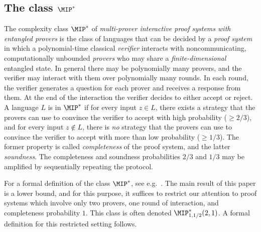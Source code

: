 \documentclass[11pt]{article}
\theoremstyle{definition}
\begin{document}
\subsection{The class $\MIP^*$}

The complexity class $\MIP^*$ of \emph{multi-prover interactive proof
  systems with entangled provers} is the class of languages that can be
decided by a \emph{proof system} in which a polynomial-time classical
\emph{verifier} interacts with noncommunicating, computationally unbounded
 \emph{provers} who may share a \emph{finite-dimensional} entangled state. In general there may be polynomially many provers,
and the verifier may interact with them over polynomially many
rounds. In each round, the verifier generates a question for
each prover and receives a response from them. At the end of
the interaction the verifier 
decides to either accept or reject. A language $L$ is in $\MIP^*$ if for
every input $z \in L$, there exists a strategy that the provers can
use to convince the verifier to accept with high probability ($\geq 2/3$), and for every input $z \not\in L$, there is
\emph{no} strategy that the provers can use to convince the verifier
to accept with more than low probability ($\geq 1/3$). The former
property is called \emph{completeness} of the proof system, and the
latter \emph{soundness}. The
completeness and soundness probabilities $2/3$ and $1/3$ may be
amplified by sequentially repeating the protocol. 

For a formal definition of the class $\MIP^*$, see e.g.~\cite[Section
  6.1]{vidick2016quantum}. 
The main result of this paper is a lower bound, and for this purpose,
it suffices  to restrict our attention to proof
systems which involve only two provers, one round of interaction, and
completeness probability $1$. This class is often denoted $\MIP^*_{1,1/2}(2,1)$. A formal definition for this restricted setting follows. 
\end{document}
